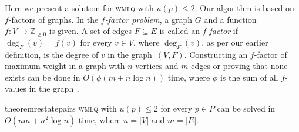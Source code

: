 \documentclass{llncs}
\begin{document}
Here we present a solution for \textsc{wmlq} with $u(p) \leq 2$. Our algorithm is based on $f$-factors of graphs. In the {\em $f$-factor problem}, a graph $G$ and a function $f: V \rightarrow \mathbb{Z}_{\geq 0}$ is given. A set of edges $F \subseteq E$ is called an \emph{$f$-factor} if $\deg_F(v) = f(v)$ for every $v \in V$, where $\deg_F(v)$, as per our earlier definition, is the degree of $v$ in the graph~$(V,F)$. Constructing an $f$-factor of maximum weight in a graph with $n$ vertices and $m$ edges or proving that none exists can be done in $O(\phi(m + n \log{n}))$ time, where $\phi$ is the sum of all $f$-values in the graph~\cite{Gab83,Gab90}.

\begin{restatable}{theorem}{restatepairs}
\label{th:u2}
	\textsc{wmlq} with $u(p) \leq 2$ for every $p \in P$ can be solved in $O(nm + n^2 \log{ n})$ time, where $n = |V|$ and $m = |E|$.
\end{restatable}
\end{document}
